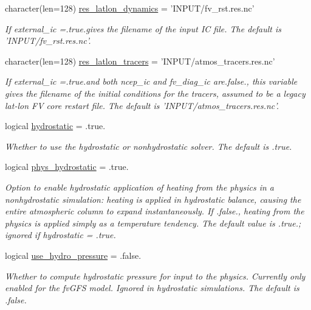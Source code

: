 \begin{DoxyCompactItemize}
character(len=128) \hyperlink{structfv__arrays__mod_1_1fv__flags__type_a46c8b4d374ce3fafe4c962d714e23fea}{res\-\_\-latlon\-\_\-dynamics} = 'I\-N\-P\-U\-T/fv\-\_\-rst.\-res.\-nc'
\begin{DoxyCompactList}\small\item\em If external\-\_\-ic =.true.\-gives the filename of the input I\-C file. The default is 'I\-N\-P\-U\-T/fv\-\_\-rst.\-res.\-nc'. \end{DoxyCompactList}\item 
character(len=128) \hyperlink{structfv__arrays__mod_1_1fv__flags__type_a285c0d08ccf233b24be34bd178b3b2f8}{res\-\_\-latlon\-\_\-tracers} = 'I\-N\-P\-U\-T/atmos\-\_\-tracers.\-res.\-nc'
\begin{DoxyCompactList}\small\item\em If external\-\_\-ic =.true.\-and both ncep\-\_\-ic and fv\-\_\-diag\-\_\-ic are.\-false., this variable gives the filename of the initial conditions for the tracers, assumed to be a legacy lat-\/lon F\-V core restart file. The default is 'I\-N\-P\-U\-T/atmos\-\_\-tracers.\-res.\-nc'. \end{DoxyCompactList}\item 
logical \hyperlink{structfv__arrays__mod_1_1fv__flags__type_a4430f93684114666ea35bb714210ab8c}{hydrostatic} = .true.
\begin{DoxyCompactList}\small\item\em Whether to use the hydrostatic or nonhydrostatic solver. The default is .true. \end{DoxyCompactList}\item 
logical \hyperlink{structfv__arrays__mod_1_1fv__flags__type_a6f95cb94dff3cd48001b488390cfe582}{phys\-\_\-hydrostatic} = .true.
\begin{DoxyCompactList}\small\item\em Option to enable hydrostatic application of heating from the physics in a nonhydrostatic simulation\-: heating is applied in hydrostatic balance, causing the entire atmospheric column to expand instantaneously. If .false., heating from the physics is applied simply as a temperature tendency. The default value is .true.; ignored if hydrostatic = .true. \end{DoxyCompactList}\item 
logical \hyperlink{structfv__arrays__mod_1_1fv__flags__type_acb17c1ce352a3f01c6f98f7ec37c15cc}{use\-\_\-hydro\-\_\-pressure} = .false.
\begin{DoxyCompactList}\small\item\em Whether to compute hydrostatic pressure for input to the physics. Currently only enabled for the fv\-G\-F\-S model. Ignored in hydrostatic simulations. The default is .false. \end{DoxyCompactList}\item 

\end{DoxyCompactItemize}
